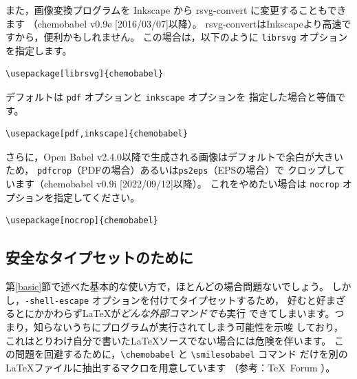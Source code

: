 \documentclass[12pt]{ltjsarticle}
\def\Lpack#1{\textsf{#1}}
\def\Lver#1{\Lpack{chemobabel} #1}
\begin{document}
また，画像変換プログラムを Inkscape から rsvg-convert に変更することもできます
（\Lver{v0.9e [2016/03/07]}以降）。
rsvg-convertはInkscapeより高速ですから，便利かもしれません。
この場合は，以下のように \verb|librsvg| オプションを指定します。
\begin{verbatim}
\usepackage[librsvg]{chemobabel}
\end{verbatim}
デフォルトは \verb|pdf| オプションと \verb|inkscape| オプションを
指定した場合と等価です。
\begin{verbatim}
\usepackage[pdf,inkscape]{chemobabel}
\end{verbatim}

さらに，Open Babel v2.4.0以降で生成される画像はデフォルトで余白が大きいため，
\verb|pdfcrop|（PDFの場合）あるいは\verb|ps2eps|（EPSの場合）で
クロップしています（\Lver{v0.9i [2022/09/12]}以降）。
これをやめたい場合は \verb|nocrop| オプションを指定してください。
\begin{verbatim}
\usepackage[nocrop]{chemobabel}
\end{verbatim}

\clearpage

\subsection{安全なタイプセットのために}
\label{extract}

第\ref{basic}節で述べた基本的な使い方で，ほとんどの場合問題ないでしょう。
しかし，\verb|-shell-escape| オプションを付けてタイプセットするため，
好むと好まざるとにかかわらず\LaTeX が\emph{どんな外部コマンドでも}実行
できてしまいます。つまり，知らないうちにプログラムが実行されてしまう可能性を示唆
しており，これはとりわけ自分で書いた\LaTeX ソースでない場合には危険を伴います。
この問題を回避するために，\verb|\chemobabel| と \verb|\smilesobabel| コマンド
だけを別の \LaTeX ファイルに抽出するマクロを用意しています
（参考：\TeX\ Forum \cite{OKU}）。
\end{document}
